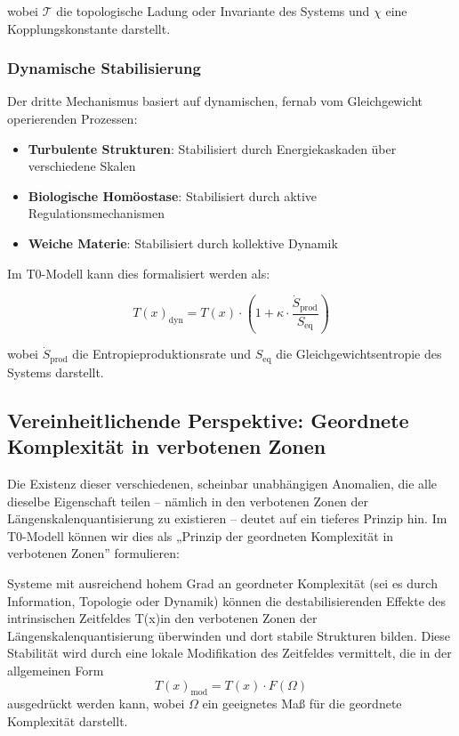 \documentclass[12pt,a4paper]{article}
\newcommand{\Tfield}{T(x)}
\begin{document}
	wobei $\mathcal{T}$ die topologische Ladung oder Invariante des Systems und $\chi$ eine Kopplungskonstante darstellt.
	
	\subsubsection{Dynamische Stabilisierung}
	
	Der dritte Mechanismus basiert auf dynamischen, fernab vom Gleichgewicht operierenden Prozessen:
	
	\begin{itemize}
		\item \textbf{Turbulente Strukturen}: Stabilisiert durch Energiekaskaden über verschiedene Skalen
		\item \textbf{Biologische Homöostase}: Stabilisiert durch aktive Regulationsmechanismen
		\item \textbf{Weiche Materie}: Stabilisiert durch kollektive Dynamik
	\end{itemize}
	
	Im T0-Modell kann dies formalisiert werden als:
	
	\begin{equation}
		\Tfield_{\text{dyn}} = \Tfield \cdot \left(1 + \kappa \cdot \frac{\dot{S}_{\text{prod}}}{S_{\text{eq}}}\right)
	\end{equation}
	
	wobei $\dot{S}_{\text{prod}}$ die Entropieproduktionsrate und $S_{\text{eq}}$ die Gleichgewichtsentropie des Systems darstellt.
	
	\subsection{Vereinheitlichende Perspektive: Geordnete Komplexität in verbotenen Zonen}
	
	Die Existenz dieser verschiedenen, scheinbar unabhängigen Anomalien, die alle dieselbe Eigenschaft teilen – nämlich in den verbotenen Zonen der Längenskalenquantisierung zu existieren – deutet auf ein tieferes Prinzip hin. Im T0-Modell können wir dies als „Prinzip der geordneten Komplexität in verbotenen Zonen'' formulieren:
	
	\begin{tcolorbox}[colback=blue!5!white,colframe=blue!75!black,title=Prinzip der geordneten Komplexität in verbotenen Zonen]
		Systeme mit ausreichend hohem Grad an geordneter Komplexität (sei es durch Information, Topologie oder Dynamik) können die destabilisierenden Effekte des intrinsischen Zeitfeldes \Tfield in den verbotenen Zonen der Längenskalenquantisierung überwinden und dort stabile Strukturen bilden. Diese Stabilität wird durch eine lokale Modifikation des Zeitfeldes vermittelt, die in der allgemeinen Form
		\begin{equation}
			\Tfield_{\text{mod}} = \Tfield \cdot F(\Omega)
		\end{equation}
		ausgedrückt werden kann, wobei $\Omega$ ein geeignetes Maß für die geordnete Komplexität darstellt.
	\end{tcolorbox}
	
\end{document}
